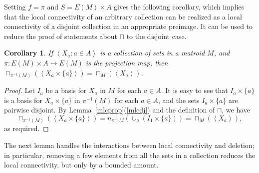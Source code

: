 \documentclass{amsart}
\theoremstyle{plain}
\newtheorem{corollary}[theorem]{Corollary}
\theoremstyle{definition}
\newcommand{\br}[1]{\left(#1\right)}
\newcommand{\ab}[1]{\left\langle#1\right\rangle}
\begin{document}
Setting $f = \pi$ and $S = E(M) \times A$ gives the following corollary,
which implies that the local connectivity of an arbitrary collection 
can be realized as a local connectivity of a disjoint collection in an appropriate preimage. 
It can be used to reduce the proof of statements about $\sqcap$ to the disjoint case. 

\begin{corollary}\label{lctodj}
  If $\ab{X_a : a \in A}$ is a collection of sets in a matroid $M$, 
  and $\pi : E(M) \times A \to E(M)$ is the projection map, then 
  $\sqcap_{\pi^{-1}(M)}\br{\ab{X_a \times \{a\}}} = \sqcap_M(\ab{X_a})$. 
\end{corollary}
\begin{proof}
  Let $I_a$ be a basis for $X_a$ in $M$ for each $a \in A$. It is easy to see 
  that $I_a \times \{a\}$ is a basis for $X_a \times \{a\}$ in $\pi^{-1}(M)$ 
  for each $a \in A$, and the sets $I_a \times \{a\}$ are pairwise disjoint. 
  By Lemma~\ref{mlcprop}(\ref{mlcdj}) and the definition of $\sqcap$, we have 
  \[\sqcap_{\pi^{-1}(M)}(\ab{X_a \times \{a\}}) 
  = n_{\pi^{-1}M}(\cup_a (I_1 \times \{a\})) = \sqcap_M(\ab{X_a}),\] 
  as required. 
\end{proof}

The next lemma handles the interactions between local connectivity and deletion; 
in particular, removing a few elements from all the sets in a collection reduces
the local connectivity, but only by a bounded amount. 
\end{document}
